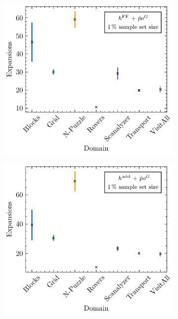 \documentclass[ppgc,diss,english]{iiufrgs}
\begin{document}
\begin{figure}[tb]
  \caption[Standard deviation of expansions using logic heuristics with \pog]{Mean number of expansions and its standard deviation per domain for GBFS guided by different logic-based heuristics and \pog trained on a $1\,\%$ sample set size.}
  \centering
  \vspace{\baselineskip}
  \begin{subfigure}{0.41\textwidth}
    \centering
    \includegraphics[width=\linewidth]{img/error_hFF_poG_1pct.pdf}
  \end{subfigure}
  \begin{subfigure}{0.41\textwidth}
    \centering
    \includegraphics[width=\linewidth]{img/error_hADD_poG_1pct.pdf}
  \end{subfigure}


\end{figure}
\end{document}
